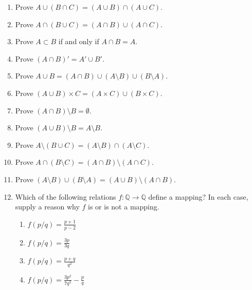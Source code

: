 {\begin{enumerate}
\item
Prove $A \cup (B \cap C) = (A \cup B) \cap (A \cup C)$.
 
\item
Prove $A \cap (B \cup C) = (A \cap B) \cup (A \cap C)$.
 
\item
Prove  $A \subset B$ if and only if $A \cap B = A$.
 
\item
Prove $(A \cap B)' = A' \cup B'$.

\item
Prove  $A \cup B = (A \cap B) \cup (A \setminus B) \cup (B \setminus A)$. 
 
\item
Prove  $(A \cup B) \times C = (A \times C ) \cup (B \times C)$.
 
\item
Prove  $(A \cap B) \setminus B = \emptyset$.
 
\item
Prove  $(A \cup B) \setminus B = A \setminus B$.
 
\item
Prove  $A \setminus (B \cup C) = (A \setminus B) \cap (A \setminus C)$. 

\item
Prove  $A \cap (B \setminus C) = (A \cap B) \setminus (A \cap C)$. 
 
 
\item
Prove  $(A \setminus B) \cup (B \setminus A) = (A \cup B) \setminus (A \cap B)$. 
 
\item
Which of the following relations $f: {\mathbb Q} \rightarrow {\mathbb Q}$
define a mapping? In each case, supply a reason why $f$ is or is not a
mapping. 
\begin{multicols}{2}
\begin{enumerate}

\item 
$\displaystyle f(p/q) = \frac{p+ 1}{p - 2}$

\item 
$\displaystyle f(p/q) = \frac{3p}{3q}$

\item 
$\displaystyle f(p/q) = \frac{p+q}{q^2}$

\item 
$\displaystyle f(p/q) = \frac{3 p^2}{7 q^2} - \frac{p}{q}$

\end{enumerate}
\end{multicols}
 

\end{enumerate}}
